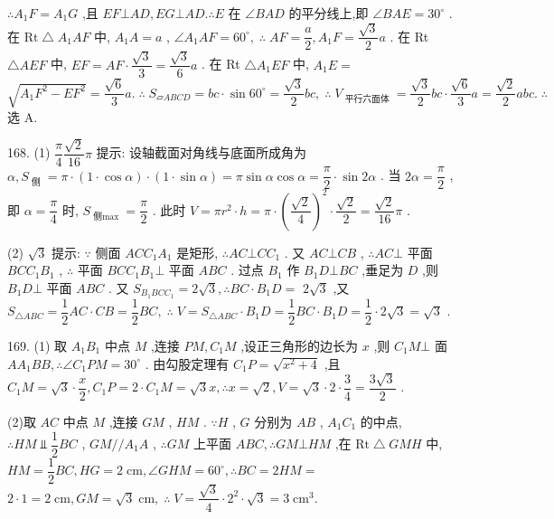 $\therefore {A}_{1}F = {A}_{1}G$ ,且 ${EF}\bot {AD},{EG}\bot {AD}.\therefore E$ 在 $\angle {BAD}$ 的平分线上,即 $\angle {BAE} = {30}^{ \circ  }$ . 在 $\mathrm{{Rt}} \bigtriangleup  {A}_{1}{AF}$ 中, ${A}_{1}A = a$ , $\angle {A}_{1}{AF} = {60}^{ \circ  },\;\therefore \;{AF} = \dfrac{a}{2},{A}_{1}F = \dfrac{\sqrt{3}}{2}a$ . 在 Rt $\bigtriangleup  {AEF}$ 中, ${EF} = {AF} \cdot  \dfrac{\sqrt{3}}{3} = \dfrac{\sqrt{3}}{6}a$ . 在 Rt $\bigtriangleup  {A}_{1}{EF}$ 中, ${A}_{1}E =$  $\sqrt{{A}_{1}{F}^{2} - E{F}^{2}} = \dfrac{\sqrt{6}}{3}a.\;\therefore \;{S}_{▱{ABCD}} = {bc} \cdot  \sin {60}^{ \circ  } = \dfrac{\sqrt{3}}{2}{bc},\;\therefore \;{V}_{\text{ 平行六面体 }} = \dfrac{\sqrt{3}}{2}{bc} \cdot  \dfrac{\sqrt{6}}{3}a = \dfrac{\sqrt{2}}{2}{abc}.\;\therefore \;$ 选 A.

168. (1) $\dfrac{\pi }{4}\dfrac{\sqrt{2}}{16}\pi$ 提示: 设轴截面对角线与底面所成角为 $\alpha ,{S}_{\text{ 侧 }} = \pi  \cdot  \left( {1 \cdot  \cos \alpha }\right)  \cdot  \left( {1 \cdot  \sin \alpha }\right)  = \pi \sin \alpha \cos \alpha  = \dfrac{\pi }{2} \cdot  \sin {2\alpha }$ . 当 ${2\alpha } = \dfrac{\pi }{2}$ ,即 $\alpha  = \dfrac{\pi }{4}$ 时, ${S}_{\text{ 侧max }} = \dfrac{\pi }{2}$ . 此时 $V = \pi {r}^{2} \cdot  h = \pi  \cdot  {\left( \dfrac{\sqrt{2}}{4}\right) }^{2} \cdot  \dfrac{\sqrt{2}}{2} = \dfrac{\sqrt{2}}{16}\pi$ .

(2) $\sqrt{3}$ 提示: $\because$ 侧面 ${AC}{C}_{1}{A}_{1}$ 是矩形, $\therefore {AC} \bot  C{C}_{1}$ . 又 ${AC} \bot  {CB}$ , $\therefore {AC} \bot$ 平面 ${BC}{C}_{1}{B}_{1}$ , $\therefore$ 平面 ${BC}{C}_{1}{B}_{1} \bot$ 平面 ${ABC}$ . 过点 ${B}_{1}$ 作 ${B}_{1}D \bot  {BC}$ ,垂足为 $D$ ,则 ${B}_{1}D \bot$ 平面 ${ABC}$ . 又 ${S}_{{B}_{1}{BC}{C}_{1}} = 2\sqrt{3},\therefore {BC} \cdot  {B}_{1}D =$  $2\sqrt{3}$ ,又 ${S}_{\bigtriangleup {ABC}} = \dfrac{1}{2}{AC} \cdot  {CB} = \dfrac{1}{2}{BC},\;\therefore \;V = {S}_{\bigtriangleup {ABC}} \cdot  {B}_{1}D = \dfrac{1}{2}{BC} \cdot  {B}_{1}D = \dfrac{1}{2} \cdot  2\sqrt{3} = \sqrt{3}$ .

169. (1) 取 ${A}_{1}{B}_{1}$ 中点 $M$ ,连接 ${PM},{C}_{1}M$ ,设正三角形的边长为 $x$ ,则 ${C}_{1}M \bot$ 面 $A{A}_{1}{BB},\therefore \angle {C}_{1}{PM} = {30}^{ \circ  }$ . 由勾股定理有 ${C}_{1}P = \sqrt{{x}^{2} + 4}$ ,且 ${C}_{1}M = \sqrt{3} \cdot  \dfrac{x}{2},{C}_{1}P = 2 \cdot  {C}_{1}M = \sqrt{3}x,\therefore x = \sqrt{2},V = \sqrt{3} \cdot  2 \cdot  \dfrac{3}{4} = \dfrac{3\sqrt{3}}{2}$ .

(2)取 ${AC}$ 中点 $M$ ,连接 ${GM}$ , ${HM}$ . $\because H$ , $G$ 分别为 ${AB}$ , ${A}_{1}{C}_{1}$ 的中点, $\therefore {HM} ⫫ \dfrac{1}{2}{BC}$ , ${GM}//{A}_{1}A$ , $\therefore {GM}$ 上平面 ${ABC},\therefore {GM} \bot  {HM}$ ,在 $\mathrm{{Rt}} \bigtriangleup  {GMH}$ 中, ${HM} = \dfrac{1}{2}{BC},{HG} = 2\mathrm{\;{cm}},\angle {GHM} = {60}^{ \circ  },\therefore {BC} = {2HM} =$  $2 \cdot  1 = 2\mathrm{\;{cm}},{GM} = \sqrt{3}\mathrm{\;{cm}},\;\therefore \;V = \dfrac{\sqrt{3}}{4} \cdot  {2}^{2} \cdot  \sqrt{3} = 3{\mathrm{\;{cm}}}^{3}.$

